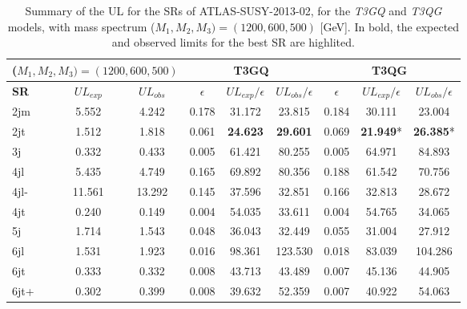 \documentclass[a4paper,10pt]{article}
\begin{document}
\begin{table}[h]
\centering
\renewcommand\arraystretch{1.3} 
\scriptsize
\begin{tabular}{ l c c    c c c  |  c c c  }
\toprule \toprule
\multicolumn{3}{c}{($M_1,M_2,M_3) = (1200,600,500)$} & \multicolumn{3}{c}{ \textbf{T3GQ}} & \multicolumn{3}{c}{ \textbf{T3QG}} \\  \toprule 
\textbf{SR} & $UL_{exp}$ & $UL_{obs}$ & $\epsilon$ &  $UL_{exp}/\epsilon$ & $UL_{obs}/\epsilon$ & $\epsilon$ & $UL_{exp}/ \epsilon$ & $UL_{obs}/ \epsilon$ \\
2jm & 5.552 &  4.242 &  0.178	 &31.172 &	23.815		 &0.184	 &30.111	 &23.004 \\
2jt  & 1.512  & 1.818 &  0.061& 	\textbf{24.623}	& \textbf{29.601}	& 	0.069	& \textbf{21.949}*& 	\textbf{26.385}* \\
3j &  0.332 &  0.433  & 0.005& 	61.421& 	80.255		& 0.005	& 64.971& 	84.893 \\ 
4jl  & 5.435 &  4.749  & 0.165	& 69.892	& 80.356	& 	0.188	& 61.542& 	70.756  \\
4jl-  & 11.561 &  13.292 &  0.145	& 37.596	& 32.851		& 0.166	& 32.813	& 28.672 \\
4jt  & 0.240  & 0.149  & 0.004& 	54.035	& 33.611		& 0.004	& 54.765& 	34.065  \\
5j  & 1.714  & 1.543  &0.048	& 36.043	& 32.449	& 	0.055	& 31.004	& 27.912  \\
6jl  & 1.531  & 1.923  & 0.016	& 98.361	& 123.530	& 	0.018	& 83.039	& 104.286 \\
6jt &  0.333  & 0.332 &  0.008	& 43.713& 	43.489	& 	0.007	& 45.136	& 44.905  \\
6jt+  & 0.302 &  0.399 & 0.008& 	39.632& 	52.359	& 	0.007	& 40.922	& 54.063 \\
\bottomrule \bottomrule
\end{tabular}
\caption{Summary of the UL for the SRs of ATLAS-SUSY-2013-02, for the \textit{T3GQ} and \textit{T3QG} models, with mass spectrum ($M_1,M_2,M_3) = (1200,600,500)$ [GeV]. In bold, the expected and observed limits for the best SR are highlited.}
\label{ATLAS02_UL_2}
\end{table}
\end{document}
